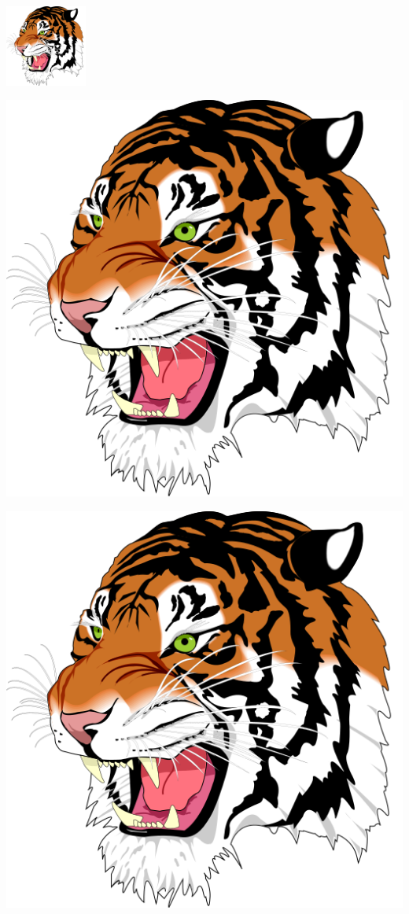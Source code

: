 \documentclass{article}
\begin{document}
\begin{center}
  \includegraphics[width = 0.2\textwidth]{Ghostscript_Tiger-512px}
\end{center}

\begin{center}
  \includegraphics[height = 0.1\textheight]{Ghostscript_Tiger-512px}
\end{center}

\begin{center}
  \includegraphics[scale = 0.3, angle = -45]{Ghostscript_Tiger-512px}
\end{center}
\end{document}
